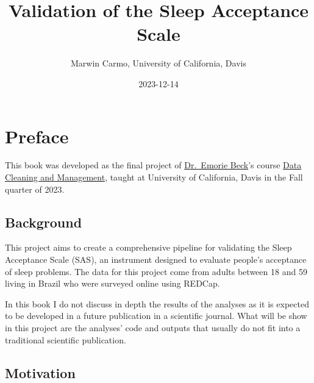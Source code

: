 \documentclass[
  letterpaper,
  DIV=11,
  numbers=noendperiod]{scrreprt}
\title{Validation of the Sleep Acceptance Scale}
\author{Marwin Carmo, University of California, Davis}
\date{2023-12-14}
\renewcommand*\contentsname{Table of contents}
\newcommand\contentsname{Table of contents}
\begin{document}
\maketitle
\ifdefined\Shaded\renewenvironment{Shaded}{\begin{tcolorbox}[boxrule=0pt, sharp corners, breakable, borderline west={3pt}{0pt}{shadecolor}, interior hidden, enhanced, frame hidden]}{\end{tcolorbox}}\fi

\renewcommand*\contentsname{Table of contents}
{
\hypersetup{linkcolor=}
\setcounter{tocdepth}{2}
\tableofcontents
}

\hypertarget{preface}{%
\chapter*{Preface}\label{preface}}


This book was developed as the final project of
\href{https://psychology.ucdavis.edu/people/edbeck}{Dr.~Emorie Beck}'s
course \href{https://emoriebeck.github.io/psc290-data-FQ23/}{Data
Cleaning and Management}, taught at University of California, Davis in
the Fall quarter of 2023.

\hypertarget{background}{%
\section*{Background}\label{background}}


This project aims to create a comprehensive pipeline for validating the
Sleep Acceptance Scale (SAS), an instrument designed to evaluate
people's acceptance of sleep problems. The data for this project come
from adults between 18 and 59 living in Brazil who were surveyed online
using REDCap.

In this book I do not discuss in depth the results of the analyses as it
is expected to be developed in a future publication in a scientific
journal. What will be show in this project are the analyses' code and
outputs that usually do not fit into a traditional scientific
publication.

\hypertarget{motivation}{%
\section*{Motivation}\label{motivation}}
\end{document}
